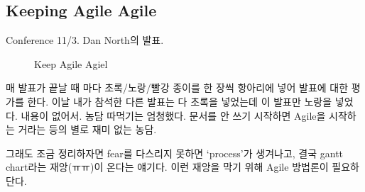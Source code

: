 \documentclass[11pt]{article}
\begin{document}
%  
%  
 
\subsection{Keeping Agile Agile}

Conference 11/3. Dan North의 발표. 

\begin{figure}[t]
    \begin{Frame}
        \begin{center}
        \end{center}
    \end{Frame}
    \caption{Keep Agile Agiel}
    \label{agile agile}
\end{figure}

매 발표가 끝날 때 마다 초록/노랑/빨강 종이를 한 장씩 항아리에 넣어
발표에 대한 평가를 한다. 이날 내가 참석한 다른 발표는 다 초록을
넣었는데 이 발표만 노랑을 넣었다. 내용이 없어서. 농담 따먹기는 엄청했다. 
문서를 안 쓰기 시작하면 Agile을 시작하는 거라는 등의 별로 재미 없는 농담.

그래도 조금 정리하자면 fear를 다스리지 못하면 `process'가 생겨나고, 
결국 gantt chart라는 재앙(ㅠㅠ)이 온다는 얘기다. 이런 재앙을 막기 위해 Agile 
방법론이 필요하단다.
\end{document}

